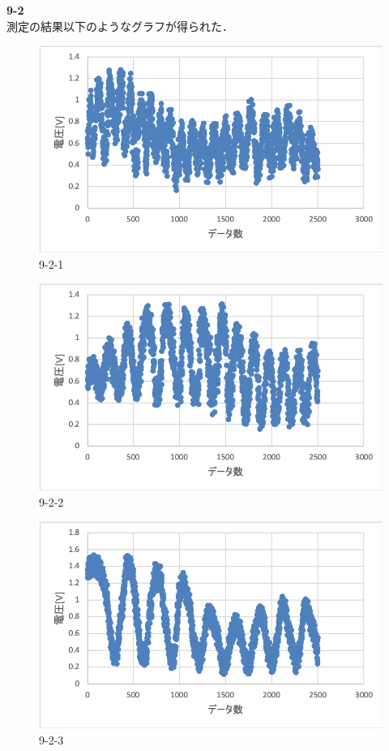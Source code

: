 \documentclass[11pt, a4paper,twocolumn]{jarticle}
\begin{document}
\noindent
\textbf{9-2} \\
測定の結果以下のようなグラフが得られた．

\begin{figure}[ht]
 \begin{center}
  \includegraphics[width=0.8\linewidth]{fig16.png}
 \end{center}
 \caption{9-2-1}
 \label{fig:16}
\end{figure}

\begin{figure}[ht]
 \begin{center}
  \includegraphics[width=0.8\linewidth]{fig17.png}
 \end{center}
 \caption{9-2-2}
 \label{fig:17}
\end{figure}

\begin{figure}[ht]
 \begin{center}
  \includegraphics[width=0.8\linewidth]{fig18.png}
 \end{center}
 \caption{9-2-3}
 \label{fig:18}
\end{figure}
\end{document}

